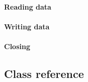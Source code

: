 \documentclass[a4paper,11pt]{report}
\begin{document}
\subsubsection{Reading data}




\subsubsection{Writing data}

\subsubsection{Closing}





\begin{appendix}

\chapter{Class reference}

 
\end{appendix}







\end{document}
